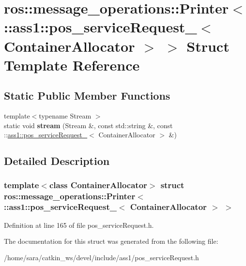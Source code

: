 \hypertarget{structros_1_1message__operations_1_1Printer_3_01_1_1ass1_1_1pos__serviceRequest___3_01ContainerAllocator_01_4_01_4}{}\section{ros\+:\+:message\+\_\+operations\+:\+:Printer$<$ \+:\+:ass1\+:\+:pos\+\_\+service\+Request\+\_\+$<$ Container\+Allocator $>$ $>$ Struct Template Reference}
\label{structros_1_1message__operations_1_1Printer_3_01_1_1ass1_1_1pos__serviceRequest___3_01ContainerAllocator_01_4_01_4}
\subsection*{Static Public Member Functions}
\begin{DoxyCompactItemize}
\item 
\mbox{\label{structros_1_1message__operations_1_1Printer_3_01_1_1ass1_1_1pos__serviceRequest___3_01ContainerAllocator_01_4_01_4_a70e3a755bea2dc78dabee323c15d2ca3}} 
{\footnotesize template$<$typename Stream $>$ }\\static void {\bfseries stream} (Stream \&, const std\+::string \&, const \+::\hyperlink{structass1_1_1pos__serviceRequest__}{ass1\+::pos\+\_\+service\+Request\+\_\+}$<$ Container\+Allocator $>$ \&)
\end{DoxyCompactItemize}


\subsection{Detailed Description}
\subsubsection*{template$<$class Container\+Allocator$>$\newline
struct ros\+::message\+\_\+operations\+::\+Printer$<$ \+::ass1\+::pos\+\_\+service\+Request\+\_\+$<$ Container\+Allocator $>$ $>$}



Definition at line 165 of file pos\+\_\+service\+Request.\+h.



The documentation for this struct was generated from the following file\+:\begin{DoxyCompactItemize}
\item 
/home/sara/catkin\+\_\+ws/devel/include/ass1/pos\+\_\+service\+Request.\+h\end{DoxyCompactItemize}

